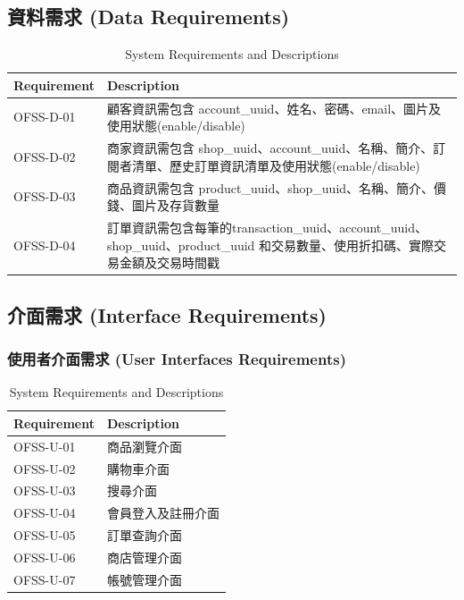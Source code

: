 \documentclass[a4paper, 12pt]{article}
\begin{document}
\subsection{資料需求 (Data Requirements)}
\begin{table}[h]
    \centering
    \renewcommand{\arraystretch}{1.35}
    \begin{tabular}{|p{3cm}|p{10cm}|}
        \hline
        \textbf{Requirement} & \textbf{Description} \\
        \hline
        OFSS-D-01 & 顧客資訊需包含 account_uuid、姓名、密碼、email、圖片及使用狀態(enable/disable) \\
        \hline
        OFSS-D-02 & 商家資訊需包含 shop_uuid、account_uuid、名稱、簡介、訂閱者清單、歷史訂單資訊清單及使用狀態(enable/disable) \\
        \hline
        OFSS-D-03 & 商品資訊需包含 product_uuid、shop_uuid、名稱、簡介、價錢、圖片及存貨數量 \\
        \hline
        OFSS-D-04 & 訂單資訊需包含每筆的transaction_uuid、account_uuid、shop_uuid、product_uuid 和交易數量、使用折扣碼、實際交易金額及交易時間戳 \\
        \hline
    \end{tabular}
    \caption{System Requirements and Descriptions}
    \label{tab:system-requirements}
\end{table}
\newpage
\subsection{介面需求 (Interface Requirements)}
\subsubsection{使用者介面需求 (User Interfaces Requirements)}
\begin{table}[h]
    \centering
    \renewcommand{\arraystretch}{1.35}
    \begin{tabular}{|p{3cm}|p{10cm}|}
        \hline
        \textbf{Requirement} & \textbf{Description} \\
        \hline
        OFSS-U-01 & 商品瀏覽介面 \\
        \hline
        OFSS-U-02 & 購物車介面 \\
        \hline
        OFSS-U-03 & 搜尋介面 \\
        \hline
        OFSS-U-04 & 會員登入及註冊介面 \\
        \hline
        OFSS-U-05 & 訂單查詢介面 \\
        \hline
        OFSS-U-06 & 商店管理介面 \\
        \hline
        OFSS-U-07 & 帳號管理介面 \\
        \hline
        
    \end{tabular}
    \caption{System Requirements and Descriptions}
    \label{tab:system-requirements}
\end{table}
\end{document}
